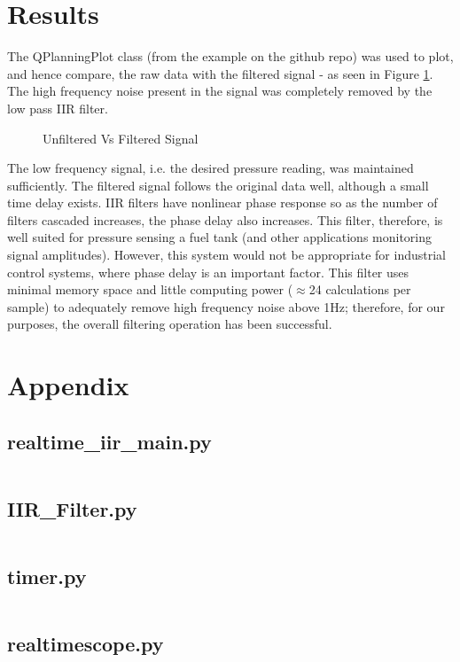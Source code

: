 \documentclass{article}
\begin{document}
\section{Results}
The QPlanningPlot class (from the example on the github repo) was used to plot, and hence compare, the raw data with the filtered signal - as seen in Figure \ref{fig:filtered}. The high frequency noise present in the signal was completely removed by the low pass IIR filter. 
\begin{figure}[H]
    \centering
    
    \caption{Unfiltered Vs Filtered Signal}
    \label{fig:filtered}
\end{figure}
The low frequency signal, i.e. the desired pressure reading, was maintained sufficiently. The filtered signal follows the original data well, although a small time delay exists. IIR filters have nonlinear phase response so as the number of filters cascaded increases, the phase delay also increases. This filter, therefore, is well suited for pressure sensing a fuel tank (and other applications monitoring signal amplitudes). However, this system would not be appropriate for industrial control systems, where phase delay is an important factor.\newline
This filter uses minimal memory space and little computing power ($\approx$24 calculations per sample) to adequately remove high frequency noise above 1Hz; therefore, for our purposes, the overall filtering operation has been successful. 


\pagebreak

\section{Appendix}
\subsection{realtime\_iir\_main.py}
\inputminted{python}{realtime_iir_main.py}

\pagebreak
\subsection{IIR\_Filter.py}
\inputminted{python}{IIR_filter.py}

\pagebreak
\subsection{timer.py}
\inputminted{python}{timer.py}

\pagebreak
\subsection{realtimescope.py}
\inputminted{python}{realtimescope.py}
\end{document}
